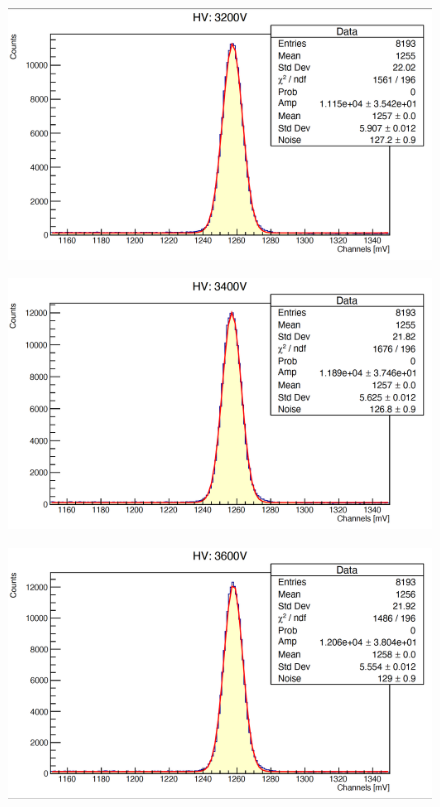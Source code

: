 \documentclass[a4paper,10pt]{article}
\begin{document}
\begin{figure}[H]
    \centering
    \includegraphics[scale=0.45]{appendice/3200}
\end{figure}
\begin{figure}[H]
    \centering
    \includegraphics[scale=0.45]{appendice/3400}
\end{figure}
\begin{figure}[H]
    \centering
    \includegraphics[scale=0.45]{appendice/3600}
\end{figure}
\end{document}
